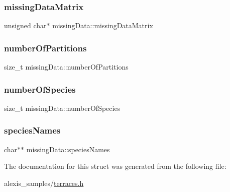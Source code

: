 \subsubsection{\texorpdfstring{missing\+Data\+Matrix}{missingDataMatrix}}
{\footnotesize\ttfamily unsigned char$\ast$ missing\+Data\+::missing\+Data\+Matrix}

\mbox{\label{structmissingData_ad72067004d4880edb70f5c1e34f9f89a}} 
\subsubsection{\texorpdfstring{number\+Of\+Partitions}{numberOfPartitions}}
{\footnotesize\ttfamily size\+\_\+t missing\+Data\+::number\+Of\+Partitions}

\mbox{\label{structmissingData_a00557e059d863ca52d69e5e7c6902bb5}} 
\subsubsection{\texorpdfstring{number\+Of\+Species}{numberOfSpecies}}
{\footnotesize\ttfamily size\+\_\+t missing\+Data\+::number\+Of\+Species}

\mbox{\label{structmissingData_af6894ef72fad6a289101c37230b9a5f6}} 
\subsubsection{\texorpdfstring{species\+Names}{speciesNames}}
{\footnotesize\ttfamily char$\ast$$\ast$ missing\+Data\+::species\+Names}



The documentation for this struct was generated from the following file\+:\begin{DoxyCompactItemize}
\item 
alexis\+\_\+samples/\hyperlink{terraces_8h}{terraces.\+h}\end{DoxyCompactItemize}
